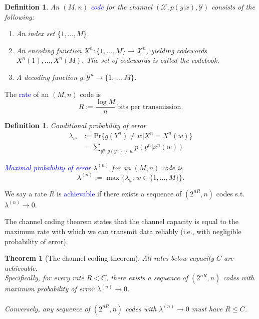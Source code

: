 \documentclass[a4paper, 11pt, openany]{book}
\numberwithin{equation}{section}
\theoremstyle{plain}
\newtheorem{theorem}	[equation]	{Theorem}
\newtheorem{definition}	[equation]	{Definition}
\theoremstyle{definition}
\newcommand{\Structure}[1]{\textcolor{blue}{#1}}
\newcommand{\alphabet}[1]{\mathcal{#1}}
\begin{document}
\begin{definition}
An $(M,n)$ \Structure{code} for the channel $(\alphabet{X}, p(y|x), \alphabet{Y})$ consists of the following:
\begin{enumerate}
	\item An index set $\{1,\ldots,M\}$.
	
	\item An encoding function $X^n : \{1,\ldots,M\} \to \alphabet{X}^n$, yielding codewords $X^n(1), \ldots, X^n(M)$. The set of codewords is called the codebook.
	
	\item A decoding function $g: \alphabet{Y}^n \to \{1,\ldots,M\}$.
\end{enumerate}
\end{definition}

The \Structure{rate} of an $(M,n)$ code is
$$
	R := \frac{\log M}{n} \, \text{bits per transmission.}
$$



\begin{definition}
Conditional probability of error 
\begin{align*}
	\lambda_w &:= \mathrm{Pr}\{g(Y^n) \ne w | X^n = X^n(w)\}\\
	&= \sum_{y^n : g(y^n) \ne w} p(y^n | x^n(w))
\end{align*}

\Structure{Maximal probability of error} $\lambda^{(n)}$ for an $(M,n)$ code is 
$$
	\lambda^{(n)} := \max \{\lambda_w : w \in \{1,\ldots,M\} \}.
$$
\end{definition}

We say a rate $R$ is \Structure{achievable} if there exists a sequence of $(2^{nR}, n)$ codes s.t. $\lambda^{(n)} \to 0$.



The channel coding theorem states that the channel capacity is equal to the maximum rate with which we can transmit data reliably (i.e., with negligible probability of error).

\begin{theorem}[The channel coding theorem]
All rates below capacity $C$ are achievable.\\
Specifically, for every rate $R < C$, there exists a sequence of $(2^{nR}, n)$ codes with maximum probability of error $\lambda^{(n)} \to 0$.\\
~\\
Conversely, any sequence of $(2^{nR}, n)$ codes with $\lambda^{(n)} \to 0$ must have $R \le C$.
\end{theorem}
\end{document}
